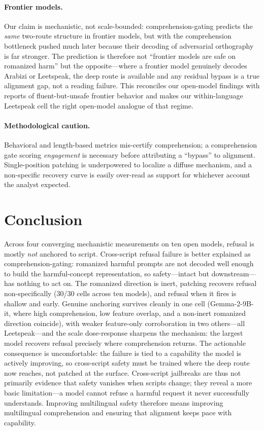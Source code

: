 \documentclass[11pt]{article}
\begin{document}
\paragraph{Frontier models.} Our claim is mechanistic, not scale-bounded: comprehension-gating predicts the \emph{same} two-route structure in frontier models, but with the comprehension bottleneck pushed much later because their decoding of adversarial orthography is far stronger. The prediction is therefore not ``frontier models are safe on romanized harm'' but the opposite---where a frontier model genuinely decodes Arabizi or Leetspeak, the deep route is available and any residual bypass is a true alignment gap, not a reading failure. This reconciles our open-model findings with reports of fluent-but-unsafe frontier behavior \citep{alghanim2024,yong2023} and makes our within-language Leetspeak cell the right open-model analogue of that regime.

\paragraph{Methodological caution.} Behavioral and length-based metrics mis-certify comprehension; a comprehension gate scoring \emph{engagement} is necessary before attributing a ``bypass'' to alignment. Single-position patching is underpowered to localize a diffuse mechanism, and a non-specific recovery curve is easily over-read as support for whichever account the analyst expected.

\section{Conclusion}
Across four converging mechanistic measurements on ten open models, refusal is mostly \emph{not} anchored to script. Cross-script refusal failure is better explained as comprehension-gating: romanized harmful prompts are not decoded well enough to build the harmful-concept representation, so safety---intact but downstream---has nothing to act on. The romanized direction is inert, patching recovers refusal non-specifically (30/30 cells across ten models), and refusal when it fires is shallow and early. Genuine anchoring survives cleanly in one cell (Gemma-2-9B-it, where high comprehension, low feature overlap, and a non-inert romanized direction coincide), with weaker feature-only corroboration in two others---all Leetspeak---and the scale dose-response sharpens the mechanism: the largest model recovers refusal precisely where comprehension returns. The actionable consequence is uncomfortable: the failure is tied to a capability the model is actively improving, so cross-script safety must be trained where the deep route now reaches, not patched at the surface. Cross-script jailbreaks are thus not primarily evidence that safety vanishes when scripts change; they reveal a more basic limitation---a model cannot refuse a harmful request it never successfully understands. Improving multilingual safety therefore means improving multilingual comprehension and ensuring that alignment keeps pace with capability.
\end{document}
